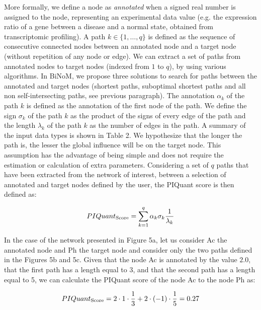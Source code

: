 \documentclass[10pt]{bmc_article}
\newenvironment{bmcformat}{\baselineskip20pt\sloppy\setboolean{publ}{false}}{\baselineskip20pt\sloppy}
\begin{document}
\begin{bmcformat}
More formally, we define a node as \textit{annotated} when a signed real
number is assigned to the node, representing an experimental data value (e.g.
the expression ratio of a gene between a disease and a normal state, obtained
from transcriptomic profiling).
 A path $k \in \{1,\ldots , q\}$ is defined
as the sequence of consecutive connected nodes
between an annotated node and a target node (without repetition of any node
or edge). We can extract a set of paths from annotated nodes to target nodes (indexed
from $1$ to $q$), by using various algorithms. In BiNoM, we propose three solutions to search for paths between the
annotated and target nodes (shortest paths, suboptimal shortest paths and all
non self-intersecting paths, see previous paragraph). The annotation
$\alpha_k$ of the path $k$ is defined as the annotation
of the first node of the path. We define the sign $\sigma_k$
of the path $k$ as the product of the signs of every edge of the path and
the length $\lambda_k$ of the path $k$ as the number of edges in the path. A summary of the input data types is shown in Table 2. We
hypothesize that the longer the path is, the lesser the global influence will be
on the target node. This assumption has the advantage of being simple and does
not require the estimation or calculation of extra parameters.
Considering a set of $q$ paths that have been extracted from the network
of interest, between a selection of annotated and target nodes defined by the user, the PIQuant score is then defined as:

$$
 PIQuant_{\textnormal{Score}} = \sum_{k=1}^{q} \alpha_{k} \sigma_{k} \frac{1}{\lambda_{k}}
$$

In the case of the network presented in Figure 5a, let us
consider Ac the annotated node and Ph the target node and consider only the two
paths defined in the Figures 5b and
5c. Given that the
node Ac is annotated by the value $2.0$, that the first path has a length
equal to 3, and that the second path has a length equal to 5, we can calculate the PIQuant score
of the node Ac to the node Ph as:

$$
 PIQuant_{\textnormal{Score}} = 2 \cdot 1 \cdot \frac{1}{3} + 2 \cdot (-1) \cdot \frac{1}{5}
= 0.27
$$



\end{bmcformat}
\end{document}

